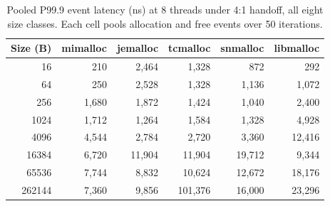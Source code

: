 \begin{table}[!htbp]
\centering
\footnotesize
\setlength{\tabcolsep}{3pt}
\caption{Pooled P99.9 event latency (ns) at 8 threads under 4:1 handoff, all eight size classes. Each cell pools allocation and free events over 50 iterations.}
\label{tab:atlas-4to1}
\begin{tabular}{rrrrrr}
\toprule
Size (B) & mimalloc & jemalloc & tcmalloc & snmalloc & libmalloc \\
\midrule
16 & 210 & 2{,}464 & 1{,}328 & 872 & 292 \\
64 & 250 & 2{,}528 & 1{,}328 & 1{,}136 & 1{,}072 \\
256 & 1{,}680 & 1{,}872 & 1{,}424 & 1{,}040 & 2{,}400 \\
1024 & 1{,}712 & 1{,}264 & 1{,}584 & 1{,}328 & 4{,}928 \\
4096 & 4{,}544 & 2{,}784 & 2{,}720 & 3{,}360 & 12{,}416 \\
16384 & 6{,}720 & 11{,}904 & 11{,}904 & 19{,}712 & 9{,}344 \\
65536 & 7{,}744 & 8{,}832 & 10{,}624 & 12{,}672 & 18{,}176 \\
262144 & 7{,}360 & 9{,}856 & 101{,}376 & 16{,}000 & 23{,}296 \\
\bottomrule
\end{tabular}
\end{table}
